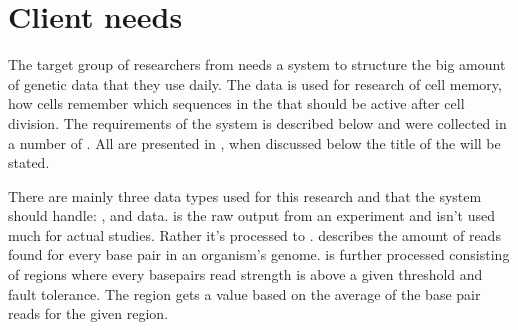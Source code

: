 


\section{Client needs}
The target group of researchers from  needs a system to structure the big amount of genetic data that they use daily. The data is used for research of cell memory, how cells remember which sequences in the  that should be active after cell division. The requirements of the system is described below and were collected in a number of . All  are presented in , when discussed below the title of the  will be stated.

There are mainly three data types used for this research and that the system should handle: ,  and  data.  is the raw output from an experiment and isn't used much for actual studies. Rather it's processed to .  describes the amount of reads found for every base pair in an organism's genome.  is further processed  consisting of regions where every basepairs read strength is above a given threshold and fault tolerance. The region gets a value based on the average of the base pair reads for the given region.

